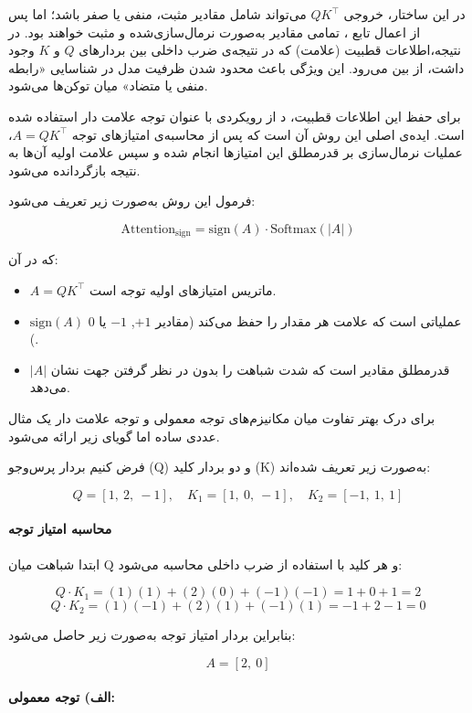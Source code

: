 در این ساختار، خروجی $QK^\top$ می‌تواند شامل مقادیر مثبت، منفی یا صفر باشد؛ اما پس از اعمال تابع ، تمامی مقادیر به‌صورت نرمال‌سازی‌شده و مثبت خواهند بود. در نتیجه،اطلاعات قطبیت (علامت) که در نتیجه‌ی ضرب داخلی بین بردارهای $Q$ و $K$ وجود داشت، از بین می‌رود. این ویژگی باعث محدود شدن ظرفیت مدل در شناسایی «رابطه منفی یا متضاد» میان توکن‌ها می‌شود.

برای حفظ این اطلاعات قطبیت، د از رویکردی با عنوان  توجه علامت دار استفاده شده است. ایده‌ی اصلی این روش آن است که پس از محاسبه‌ی امتیازهای توجه $A = QK^\top$، عملیات نرمال‌سازی  بر قدرمطلق این امتیازها انجام شده و سپس علامت اولیه آن‌ها به نتیجه بازگردانده می‌شود.

فرمول این روش به‌صورت زیر تعریف می‌شود:

\[
\text{Attention}_{\text{sign}} = \text{sign}(A) \cdot \text{Softmax}(|A|)
\]

که در آن:
\begin{itemize}
	\item $A = QK^\top$ ماتریس امتیازهای اولیه توجه است.
	\item $\text{sign}(A)$ عملیاتی است که علامت هر مقدار را حفظ می‌کند (مقادیر $+1$, $-1$ یا $0$).
	\item $|A|$ قدرمطلق مقادیر است که شدت شباهت را بدون در نظر گرفتن جهت نشان می‌دهد.
\end{itemize}


برای درک بهتر تفاوت میان مکانیزم‌های توجه معمولی و توجه علامت دار یک مثال عددی ساده اما گویای زیر ارائه می‌شود.

فرض کنیم  بردار پرس‌وجو (Q) و دو بردار کلید (K) به‌صورت زیر تعریف شده‌اند:

\[
Q = [1,\ 2,\ -1], \quad
K_1 = [1,\ 0,\ -1], \quad
K_2 = [-1,\ 1,\ 1]
\]

\paragraph{محاسبه امتیاز توجه}

ابتدا شباهت میان Q و هر کلید با استفاده از ضرب داخلی محاسبه می‌شود:

\[
Q \cdot K_1 = (1)(1) + (2)(0) + (-1)(-1) = 1 + 0 + 1 = 2
\]
\[
Q \cdot K_2 = (1)(-1) + (2)(1) + (-1)(1) = -1 + 2 -1 = 0
\]

بنابراین بردار امتیاز توجه به‌صورت زیر حاصل می‌شود:

\[
A = [2,\ 0]
\]

\paragraph{الف) توجه معمولی:}

